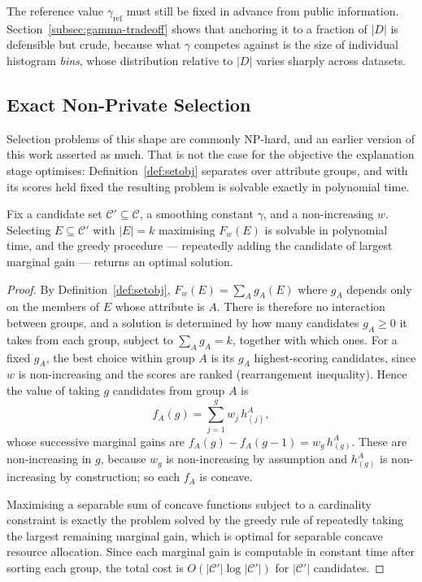 The reference value $\gamma_{\text{ref}}$ must still be fixed in advance from public information.
Section~\ref{subsec:gamma-tradeoff} shows that anchoring it to a fraction of $|D|$ is defensible but crude, because what $\gamma$ competes against is the size of individual histogram \emph{bins}, whose distribution relative to $|D|$ varies sharply across datasets.

\subsection{Exact Non-Private Selection}
\label{subsec:non-private-hardness}

Selection problems of this shape are commonly NP-hard, and an earlier version of this work asserted as much.
That is not the case for the objective the explanation stage optimises: Definition~\ref{def:setobj} separates over attribute groups, and with its scores held fixed the resulting problem is solvable exactly in polynomial time.

\begin{theorem}
\label{thm:non-private-hardness}
Fix a candidate set $\mathcal{C}'\subseteq\mathcal{C}$, a smoothing constant $\gamma$, and a non-increasing $w$.
Selecting $E\subseteq\mathcal{C}'$ with $|E|=k$ maximising $F_w(E)$ is solvable in polynomial time, and the greedy procedure --- repeatedly adding the candidate of largest marginal gain --- returns an optimal solution.
\end{theorem}

\begin{proof}
By Definition~\ref{def:setobj}, $F_w(E)=\sum_A g_A(E)$ where $g_A$ depends only on the members of $E$ whose attribute is $A$.
There is therefore no interaction between groups, and a solution is determined by how many candidates $g_A\ge0$ it takes from each group, subject to $\sum_A g_A=k$, together with which ones.
For a fixed $g_A$, the best choice within group $A$ is its $g_A$ highest-scoring candidates, since $w$ is non-increasing and the scores are ranked (rearrangement inequality).
Hence the value of taking $g$ candidates from group $A$ is
\[
f_A(g)=\sum_{j=1}^{g} w_j\, h^A_{(j)},
\]
whose successive marginal gains are $f_A(g)-f_A(g-1)=w_g\,h^A_{(g)}$.
These are non-increasing in $g$, because $w_g$ is non-increasing by assumption and $h^A_{(g)}$ is non-increasing by construction; so each $f_A$ is concave.

Maximising a separable sum of concave functions subject to a cardinality constraint is exactly the problem solved by the greedy rule of repeatedly taking the largest remaining marginal gain, which is optimal for separable concave resource allocation.
Since each marginal gain is computable in constant time after sorting each group, the total cost is $O(|\mathcal{C}'|\log|\mathcal{C}'|)$ for $|\mathcal{C}'|$ candidates.
\end{proof}

